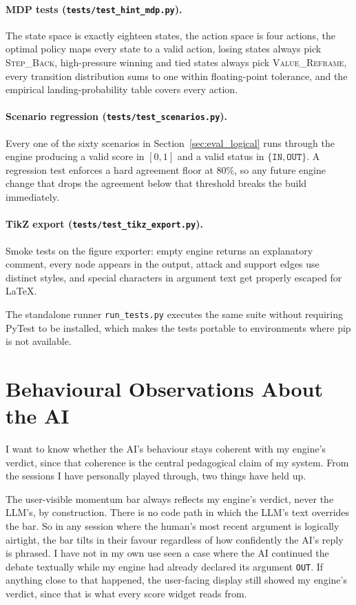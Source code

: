 \paragraph{MDP tests (\texttt{tests/test\_hint\_mdp.py}).} The state space is exactly eighteen states, the action space is four actions, the optimal policy maps every state to a valid action, losing states always pick \textsc{Step\_Back}, high-pressure winning and tied states always pick \textsc{Value\_Reframe}, every transition distribution sums to one within floating-point tolerance, and the empirical landing-probability table covers every action.

\paragraph{Scenario regression (\texttt{tests/test\_scenarios.py}).} Every one of the sixty scenarios in Section~\ref{sec:eval_logical} runs through the engine producing a valid score in $[0,1]$ and a valid status in $\{\texttt{IN}, \texttt{OUT}\}$. A regression test enforces a hard agreement floor at $80\%$, so any future engine change that drops the agreement below that threshold breaks the build immediately.

\paragraph{TikZ export (\texttt{tests/test\_tikz\_export.py}).} Smoke tests on the figure exporter: empty engine returns an explanatory comment, every node appears in the output, attack and support edges use distinct styles, and special characters in argument text get properly escaped for LaTeX.

The standalone runner \texttt{run\_tests.py} executes the same suite without requiring PyTest to be installed, which makes the tests portable to environments where pip is not available.

\section{Behavioural Observations About the AI}
\label{sec:eval_ai}
I want to know whether the AI's behaviour stays coherent with my engine's verdict, since that coherence is the central pedagogical claim of my system. From the sessions I have personally played through, two things have held up.

The user-visible momentum bar always reflects my engine's verdict, never the LLM's, by construction. There is no code path in which the LLM's text overrides the bar. So in any session where the human's most recent argument is logically airtight, the bar tilts in their favour regardless of how confidently the AI's reply is phrased. I have not in my own use seen a case where the AI continued the debate textually while my engine had already declared its argument \texttt{OUT}. If anything close to that happened, the user-facing display still showed my engine's verdict, since that is what every score widget reads from.

